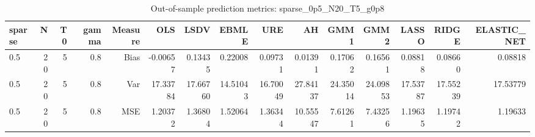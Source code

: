 \begin{table}[!htbp]\centering
\caption{Out-of-sample prediction metrics: sparse_0p5_N20_T5_g0p8}
\label{tab:table3_sparse_0p5_N20_T5_g0p8}
\begin{tabular}{lrrrrrrrrrrrrrr}
\hline
sparse & N & T0 & gamma & Measure & OLS & LSDV & EBMLE & URE & AH & GMM1 & GMM2 & LASSO & RIDGE & ELASTIC_NET \\
\hline
0.5 & 20 & 5 & 0.8 & Bias & -0.00657 & 0.13435 & 0.22008 & 0.09731 & 0.01391 & 0.17062 & 0.16561 & 0.08818 & 0.08660 & 0.08818 \\
0.5 & 20 & 5 & 0.8 & Var & 17.33784 & 17.66760 & 14.51043 & 16.70049 & 27.84137 & 24.35014 & 24.09853 & 17.53787 & 17.55239 & 17.53779 \\
0.5 & 20 & 5 & 0.8 & MSE & 1.20372 & 1.36804 & 1.52064 & 1.36344 & 10.55547 & 7.61261 & 7.43256 & 1.19635 & 1.19742 & 1.19633 \\
\hline
\end{tabular}
\end{table}

